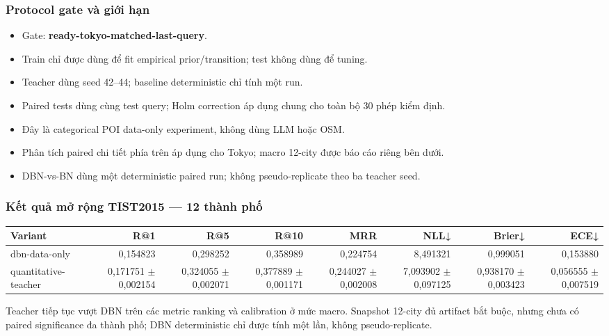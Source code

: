 \subsubsection*{Protocol gate và giới hạn}

\begin{itemize}
\item Gate: \textbf{ready-tokyo-matched-last-query}.
\item Train chỉ được dùng để fit empirical prior/transition; test không dùng để tuning.
\item Teacher dùng seed 42--44; baseline deterministic chỉ tính một run.
\item Paired tests dùng cùng test query; Holm correction áp dụng chung cho toàn bộ 30 phép kiểm định.
\item Đây là categorical POI data-only experiment, không dùng LLM hoặc OSM.
\item Phân tích paired chi tiết phía trên áp dụng cho Tokyo; macro 12-city được báo cáo riêng bên dưới.
\item DBN-vs-BN dùng một deterministic paired run; không pseudo-replicate theo ba teacher seed.
\end{itemize}

\subsubsection*{Kết quả mở rộng TIST2015 --- 12 thành phố}

\begin{table}[!htbp]
\centering
\scriptsize
\setlength{\tabcolsep}{2.5pt}
\begin{adjustbox}{max width=\textwidth}
\begin{tabular}{@{}lrrrrrrr@{}}
\toprule
Variant & R@1 & R@5 & R@10 & MRR & NLL↓ & Brier↓ & ECE↓ \\
\midrule
dbn-data-only & 0,154823 & 0,298252 & 0,358989 & 0,224754 & 8,491321 & 0,999051 & 0,153880 \\
quantitative-teacher & 0,171751 $\pm$ 0,002154 & 0,324055 $\pm$ 0,002071 & 0,377889 $\pm$ 0,001171 & 0,244027 $\pm$ 0,002008 & 7,093902 $\pm$ 0,097125 & 0,938170 $\pm$ 0,003423 & 0,056555 $\pm$ 0,007519 \\
\bottomrule
\end{tabular}
\end{adjustbox}
\end{table}

Teacher tiếp tục vượt DBN trên các metric ranking và calibration ở mức macro. Snapshot 12-city đủ artifact bắt buộc, nhưng chưa có paired significance đa thành phố; DBN deterministic chỉ được tính một lần, không pseudo-replicate.


